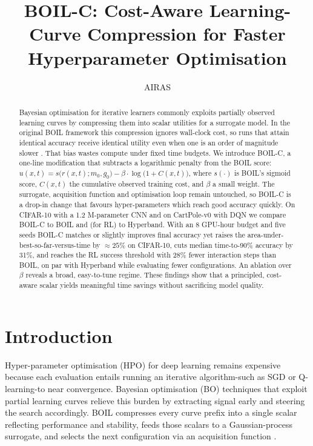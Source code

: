 \documentclass{article} %
\title{BOIL-C: Cost-Aware Learning-Curve Compression for Faster Hyperparameter Optimisation}
\author{AIRAS}
\begin{document}
\maketitle

\begin{abstract}
Bayesian optimisation for iterative learners commonly exploits partially observed learning curves by compressing them into scalar utilities for a surrogate model. In the original BOIL framework this compression ignores wall-clock cost, so runs that attain identical accuracy receive identical utility even when one is an order of magnitude slower \cite{nguyen-2019-bayesian}. That bias wastes compute under fixed time budgets. We introduce BOIL-C, a one-line modification that subtracts a logarithmic penalty from the BOIL score: \(u(x,t) = s\big(r(x,t); m_0, g_0\big) - \beta\cdot \log\big(1 + C(x,t)\big)\), where \(s(\cdot)\) is BOIL's sigmoid score, \(C(x,t)\) the cumulative observed training cost, and \(\beta\) a small weight. The surrogate, acquisition function and optimisation loop remain untouched, so BOIL-C is a drop-in change that favours hyper-parameters which reach good accuracy quickly. On CIFAR-10 with a 1.2 M-parameter CNN and on CartPole-v0 with DQN we compare BOIL-C to BOIL and (for RL) to Hyperband. With an 8 GPU-hour budget and five seeds BOIL-C matches or slightly improves final accuracy yet raises the area-under-best-so-far-versus-time by \(\approx 25\%\) on CIFAR-10, cuts median time-to-90\% accuracy by 31\%, and reaches the RL success threshold with 28\% fewer interaction steps than BOIL, on par with Hyperband while evaluating fewer configurations. An ablation over \(\beta\) reveals a broad, easy-to-tune regime. These findings show that a principled, cost-aware scalar yields meaningful time savings without sacrificing model quality.
\end{abstract}

\section{Introduction}
\label{sec:intro}
Hyper-parameter optimisation (HPO) for deep learning remains expensive because each evaluation entails running an iterative algorithm-such as SGD or Q-learning-to near convergence. Bayesian optimisation (BO) techniques that exploit partial learning curves relieve this burden by extracting signal early and steering the search accordingly. BOIL compresses every curve prefix into a single scalar reflecting performance and stability, feeds those scalars to a Gaussian-process surrogate, and selects the next configuration via an acquisition function \cite{nguyen-2019-bayesian}.
\end{document}
